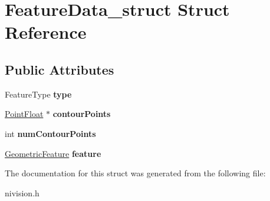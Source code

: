 \hypertarget{structFeatureData__struct}{\section{\-Feature\-Data\-\_\-struct \-Struct \-Reference}
\label{structFeatureData__struct}
}
\subsection*{\-Public \-Attributes}
\begin{DoxyCompactItemize}
\item 
\hypertarget{structFeatureData__struct_a6476e22e6176ad13876910ada2513702}{\-Feature\-Type {\bfseries type}}\label{structFeatureData__struct_a6476e22e6176ad13876910ada2513702}

\item 
\hypertarget{structFeatureData__struct_aecde9a8aec6977141140e4954b513f08}{\hyperlink{structPointFloat__struct}{\-Point\-Float} $\ast$ {\bfseries contour\-Points}}\label{structFeatureData__struct_aecde9a8aec6977141140e4954b513f08}

\item 
\hypertarget{structFeatureData__struct_a330e409103f7856a38b37ff087fa7745}{int {\bfseries num\-Contour\-Points}}\label{structFeatureData__struct_a330e409103f7856a38b37ff087fa7745}

\item 
\hypertarget{structFeatureData__struct_a39062daf726ef1dbd7cea9fb6328e0c8}{\hyperlink{unionGeometricFeature__union}{\-Geometric\-Feature} {\bfseries feature}}\label{structFeatureData__struct_a39062daf726ef1dbd7cea9fb6328e0c8}

\end{DoxyCompactItemize}


\-The documentation for this struct was generated from the following file\-:\begin{DoxyCompactItemize}
\item 
nivision.\-h\end{DoxyCompactItemize}

